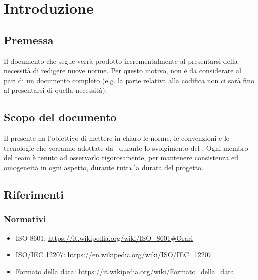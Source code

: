 \section{Introduzione}

    \subsection{Premessa}
    Il documento che segue verrà prodotto incrementalmente al presentarsi della necessità di redigere nuove norme.
    Per questo motivo, non è da considerare al pari di un documento completo (e.g. la parte relativa alla codifica non ci sarà fino
    al presentarsi di quella necessità).

    \subsection{Scopo del documento}
    Il presente  ha l’obiettivo di mettere in chiaro le norme, le convenzioni e le tecnologie
    che verranno adottate da \gruppo\ durante lo svolgimento del . Ogni membro del team
    \`e tenuto ad osservarlo rigorosamente, per mantenere consistenza ed omogeneit\`a in ogni aspetto, durante tutta la durata del progetto.\par

    

    

\subsection{Riferimenti}

    \subsubsection{Normativi}	\label{rifnorma}
    \begin{itemize}
    	\item ISO 8601: \url{https://it.wikipedia.org/wiki/ISO\_8601#Orari}
    	\item ISO/IEC 12207: \url{https://en.wikipedia.org/wiki/ISO/IEC_12207}
    	\item Formato della data: \url{https://it.wikipedia.org/wiki/Formato\_della\_data}
    \end{itemize}

